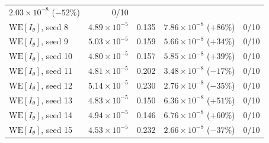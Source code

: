 \documentclass[11pt]{article}
\begin{document}
\begin{table}[h]
\begin{tabular}{lrrrr}
			$2.03\times10^{-8}$ ($-52\%$) & 0/10 \\
			$\mathrm{WE}[I_\theta]$, seed 8 & $4.89\times10^{-5}$ & 0.135 &
			$7.86\times10^{-8}$ ($+86\%$) & 0/10 \\
			$\mathrm{WE}[I_\theta]$, seed 9 & $5.03\times10^{-5}$ & 0.159 &
			$5.66\times10^{-8}$ ($+34\%$) & 0/10 \\
			$\mathrm{WE}[I_\theta]$, seed 10 & $4.80\times10^{-5}$ & 0.157 &
			$5.85\times10^{-8}$ ($+39\%$) & 0/10 \\
			$\mathrm{WE}[I_\theta]$, seed 11 & $4.81\times10^{-5}$ & 0.202 &
			$3.48\times10^{-8}$ ($-17\%$) & 0/10 \\
			$\mathrm{WE}[I_\theta]$, seed 12 & $5.14\times10^{-5}$ & 0.230 &
			$2.76\times10^{-8}$ ($-35\%$) & 0/10 \\
			$\mathrm{WE}[I_\theta]$, seed 13 & $4.83\times10^{-5}$ & 0.150 &
			$6.36\times10^{-8}$ ($+51\%$) & 0/10 \\
			$\mathrm{WE}[I_\theta]$, seed 14 & $4.94\times10^{-5}$ & 0.146 &
			$6.76\times10^{-8}$ ($+60\%$) & 0/10 \\
			$\mathrm{WE}[I_\theta]$, seed 15 & $4.53\times10^{-5}$ & 0.232 &
			$2.66\times10^{-8}$ ($-37\%$) & 0/10 \\
			\bottomrule
		\end{tabular}
	\end{table}
\end{document}
